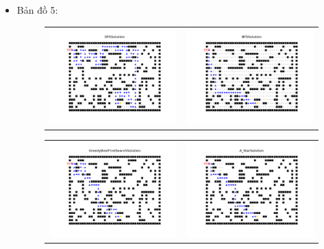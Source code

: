 \documentclass[11pt]{article} %
\begin{document}
\begin{itemize}
		\newpage
	\item Bản đồ 5:
	\begin{figure}[h] \label{bd5}
		\centering
		\begin{tabular}{cc}
			\includegraphics[width=8.5cm]{Figures/fg5_dfs.png} &
			\includegraphics[width=8.5cm]{Figures/fg5_bfs.png} \\
		\end{tabular}
	\end{figure}
	\begin{figure}[h] \label{Hình 5}
		\centering
		\begin{tabular}{cc}
			\includegraphics[width=8.5cm]{Figures/fg5_gbfs.png} &
			\includegraphics[width=8.5cm]{Figures/fg5_astar.png}

\end{tabular}
\end{figure}
\end{itemize}
\end{document}

